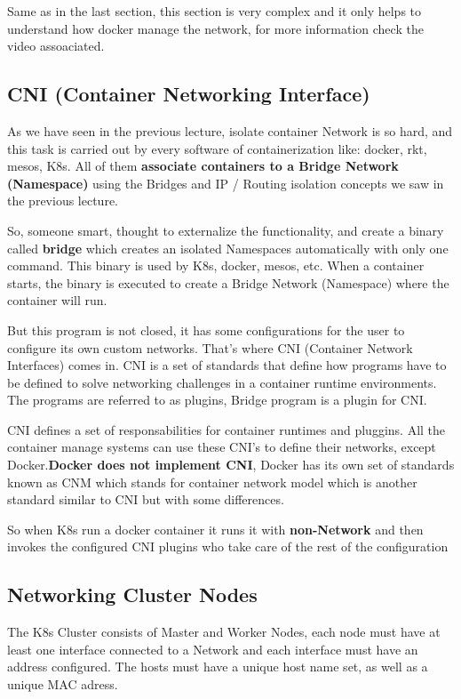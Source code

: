 \documentclass{article}
\begin{document}
Same as in the last section, this section is very complex and it only helps to understand how docker manage the network, for more information check the video assoaciated.

\subsection{CNI (Container Networking Interface)}

As we have seen in the previous lecture, isolate container Network is so hard, and this task is carried out by every software of containerization like: docker, rkt, mesos, K8s. All of them \textbf{associate containers to a Bridge Network (Namespace)} using the Bridges and IP / Routing isolation concepts we saw in the previous lecture.

So, someone smart, thought to externalize the functionality, and create a binary called \textbf{bridge} which creates an isolated Namespaces automatically with only one command. This binary is used by K8s, docker, mesos, etc. When a container starts, the binary is executed to create a Bridge Network (Namespace) where the container will run.

But this program is not closed, it has some configurations for the user to configure its own custom networks. That's where CNI (Container Network Interfaces) comes in. CNI is a set of standards that define how programs have to be defined to solve networking challenges in a container runtime environments. The programs are referred to as plugins, Bridge program is a plugin for CNI.

CNI defines a set of responsabilities  for container runtimes and pluggins. All the container manage systems can use these CNI's to define their networks, except Docker.\textbf{Docker does not implement CNI}, Docker has its own set of standards known as CNM which stands for container network model which is another standard similar to CNI but with some differences.

So when K8s run a docker container it runs it with \textbf{non-Network} and then invokes the configured CNI plugins who take care of the rest of the configuration

\subsection{Networking Cluster Nodes}

The K8s Cluster consists of Master and Worker Nodes, each node must have at least one interface connected to a Network and each interface must have an address configured. The hosts must have a unique host name set, as well as a unique MAC adress.
\end{document}
